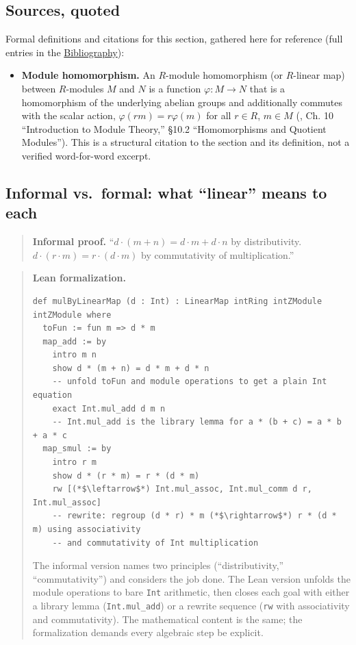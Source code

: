 \subsection{Sources, quoted}\label{sec:11-modules:05-linear-maps:2}

Formal definitions and citations for this section, gathered here for reference (full entries in the \hyperref[sec:root:bibliography:1]{Bibliography}):

\begin{itemize}
\tightlist
\item
  \textbf{Module homomorphism.} An \(R\)-module homomorphism (or \(R\)-linear map) between \(R\)-modules \(M\) and \(N\) is a function \(\varphi : M \to N\) that is a homomorphism of the underlying abelian groups and additionally commutes with the scalar action, \(\varphi(rm) = r\varphi(m)\) for all \(r \in R\), \(m \in M\) (\cite{DummitFoote2003}, Ch. 10 ``Introduction to Module Theory,'' §10.2 ``Homomorphisms and Quotient Modules''). This is a structural citation to the section and its definition, not a verified word-for-word excerpt.
\end{itemize}

\subsection{Informal vs.~formal: what ``linear'' means to each}\label{sec:11-modules:05-linear-maps:3}

\begin{quote}
\textbf{Informal proof.} ``\(d \cdot (m + n) = d \cdot m + d \cdot n\) by distributivity. \(d \cdot (r \cdot m) = r \cdot (d \cdot m)\) by commutativity of multiplication.''
\end{quote}

\begin{quote}
\textbf{Lean formalization.}

\begin{lstlisting}
def mulByLinearMap (d : Int) : LinearMap intRing intZModule intZModule where
  toFun := fun m => d * m
  map_add := by
    intro m n
    show d * (m + n) = d * m + d * n
    -- unfold toFun and module operations to get a plain Int equation
    exact Int.mul_add d m n
    -- Int.mul_add is the library lemma for a * (b + c) = a * b + a * c
  map_smul := by
    intro r m
    show d * (r * m) = r * (d * m)
    rw [(*$\leftarrow$*) Int.mul_assoc, Int.mul_comm d r, Int.mul_assoc]
    -- rewrite: regroup (d * r) * m (*$\rightarrow$*) r * (d * m) using associativity
    -- and commutativity of Int multiplication
\end{lstlisting}

The informal version names two principles (``distributivity,'' ``commutativity'') and considers the job done. The Lean version unfolds the module operations to bare \texttt{Int} arithmetic, then closes each goal with either a library lemma (\texttt{Int.mul\_\allowbreak{}add}) or a rewrite sequence (\texttt{rw} with associativity and commutativity). The mathematical content is the same; the formalization demands every algebraic step be explicit.
\end{quote}

